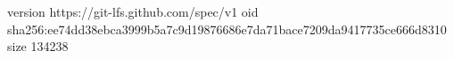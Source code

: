 version https://git-lfs.github.com/spec/v1
oid sha256:ee74dd38ebca3999b5a7c9d19876686e7da71bace7209da9417735ce666d8310
size 134238
